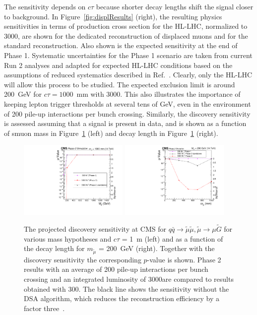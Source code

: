 The sensitivity depends on $c\tau$ because shorter decay lengths shift the signal closer to background. In Figure~\ref{fig:displResults} (right), the resulting physics sensitivities in terms of production cross section for the HL-LHC, normalized to $3000$\fbinv, are shown for the dedicated reconstruction of displaced muons and for the standard reconstruction. Also shown is the expected sensitivity at the end of Phase 1. Systematic uncertainties for the Phase 1 scenario are taken from current Run 2 analyses and adapted for expected HL-LHC conditions based on the assumptions of reduced systematics described in Ref.~\cite{FTR-16-005}. Clearly, only the HL-LHC will allow this process to be studied. The expected exclusion limit is around 200~GeV for $c\tau = 1000$~mm with 3000\fbinv. This also illustrates the importance of keeping lepton trigger thresholds at several tens of GeV, even in the environment of 200 pile-up interactions per bunch crossing.
Similarly, the discovery sensitivity is assessed assuming that a signal is present in data, and is shown as a function of smuon mass in Figure~\ref{fig:displResultsSensitiviy} (left) and decay length in Figure~\ref{fig:displResultsSensitiviy} (right).

\begin{figure}[t]\begin{center}
\includegraphics[width=0.47\textwidth]{figures/SignificanceComp.pdf}
\includegraphics[width=0.47\textwidth]{figures/SignificanceComp_asfuncofCtau.pdf}
\caption{The projected discovery sensitivity at CMS for  $q \bar q \to \widetilde{\mu} \widetilde{\mu}, \widetilde{\mu}\rightarrow \mu\widetilde{G}$ for various mass hypotheses and $c\tau$ = 1~m (left) and as a function of the decay length for $m_{\widetilde{\mu}}$ = 200~GeV (right). Together with the discovery sensitivity the corresponding $p$-value is shown. Phase 2 results with an average of 200 pile-up interactions per bunch crossing and an integrated luminosity of 3000\fbinv are compared to results obtained with 300\fbinv. The black line shows the sensitivity without the DSA algorithm, which reduces the reconstruction efficiency by a factor three~\cite{henningkeller2018}.
 }
\label{fig:displResultsSensitiviy}
\end{center}
\end{figure}


